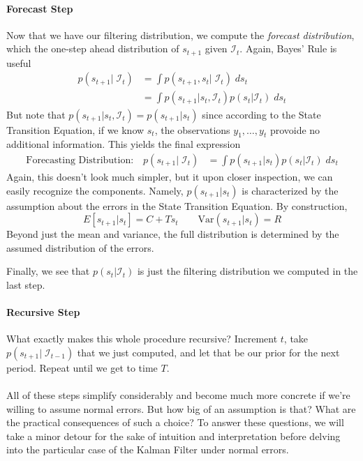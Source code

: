 \documentclass[a4paper,12pt]{article}
\begin{document}
\paragraph{Forecast Step} Now that we have our filtering distribution, we compute the \emph{forecast distribution}, which the one-step ahead distribution of $s_{t+1}$ given $\mathcal{I}_{t}$. Again, Bayes' Rule is useful
\begin{align*}
  p(s_{t+1} | \; \mathcal{I}_{t}) &= 
    \int p(s_{t+1}, s_t |\; \mathcal{I}_{t}) \; ds_t \\
  &= \int p(s_{t+1} |  s_t, \mathcal{I}_{t}) 
    p(s_t |  \mathcal{I}_{t}) \; ds_t 
\end{align*}
But note that $p(s_{t+1} | s_t, \mathcal{I}_{t}) = p(s_{t+1}|s_t)$ since according to the State Transition Equation, if we know $s_{t}$, the observations $y_1, \ldots, y_t$ provoide no additional information. This yields the final expression
\begin{align}
  \text{Forecasting Distribution:} \quad
  p(s_{t+1} | \; \mathcal{I}_{t}) 
  &= \int p(s_{t+1} |  s_t) 
    p(s_t |  \mathcal{I}_{t}) \; ds_t 
\end{align}
Again, this doesn't look much simpler, but it upon closer inspection, we can easily recognize the components. Namely, $p(s_{t+1}|s_t)$ is characterized by the assumption about the errors in the State Transition Equation. By construction,
\[
  E[s_{t+1}|s_t] = C + Ts_t
  \qquad 
  \text{Var}(s_{t+1}|s_t) = R
\]
Beyond just the mean and variance, the full distribution is
determined by the assumed distribution of the errors.

Finally, we see that $p(s_t|\mathcal{I}_{t})$ is just the
filtering distribution we computed in the last step. 

\paragraph{Recursive Step} What exactly makes this whole procedure recursive? Increment $t$, take $p(s_{t+1}|\;\mathcal{I}_{t-1})$ that we just computed, and let that be our prior for the next period. Repeat until we get to time $T$.
\\
\\
All of these steps simplify considerably and become much more concrete if we're willing to assume normal errors. But how big of an assumption is that? What are the practical consequences of such a choice? To answer these questions, we will take a minor detour for the sake of intuition and interpretation before delving into the particular case of the Kalman Filter under normal errors.
\end{document}
